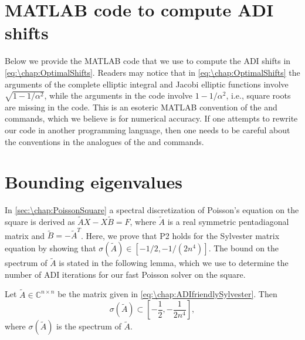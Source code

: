 
\chapter{MATLAB code to compute ADI shifts}\label{app:\chap:ADIshifts}
Below we provide the MATLAB code that we use to compute the ADI shifts in \cref{eq:\chap:OptimalShifts}. Readers may notice that in \cref{eq:\chap:OptimalShifts} the arguments of the complete elliptic integral and Jacobi elliptic functions involve $\sqrt{1-1/\alpha^2}$, while the arguments in the code involve $1-1/\alpha^2$, i.e., square roots are missing in the code. This is an esoteric MATLAB convention of the  and  commands, which we believe is for numerical accuracy. If one attempts to rewrite our code in another programming language, then one needs to be careful about the conventions in the analogues of the  and  commands.

\vspace{1em}



\chapter{Bounding eigenvalues}\label{app:\chap:spectrum}
In \cref{sec:\chap:PoissonSquare} a spectral discretization of Poisson's equation on the square is derived as $\tilde{A}X - X\tilde{B} = F$, where $\tilde{A}$ is a real symmetric pentadiagonal matrix and $\tilde{B} = -\tilde{A}^T$. Here, we prove that P2 holds for the Sylvester matrix equation by showing that $\sigma(\tilde{A})\in [-1/2,-1/(2n^4)]$. The bound on the spectrum of $\tilde{A}$ is stated in the following lemma, which we use to determine the number of ADI iterations for our fast Poisson solver on the square.

\begin{lemma}
Let $\tilde{A}\in\mathbb{C}^{n\times n}$ be the matrix given in \cref{eq:\chap:ADIfriendlySylvester}. Then
\begin{equation}
\sigma(\tilde{A}) \subset \left[ -\frac{1}{2}, -\frac{1}{2n^4} \right],
\label{eq:\chap:SpectrumBound}
\end{equation} 
where $\sigma(\tilde{A})$ is the spectrum of $\tilde{A}$. 
\label{lem:EigenvaluesOfA2}
\end{lemma}

